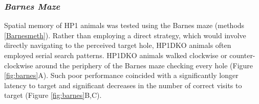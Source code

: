 \documentclass[onehalf,12pt]{beavtex}
\begin{document}
  \FloatBarrier
  
  \subsubsection*{\texorpdfstring{\emph{Barnes
  Maze}}{Barnes Maze}}\label{barnes-maze}
  
  Spatial memory of HP1 animals was tested using the Barnes maze (methods
  \ref{Barnesmeth}). Rather than employing a direct strategy, which would
  involve directly navigating to the perceived target hole, HP1DKO animals
  often employed serial search patterns. HP1DKO animals walked clockwise
  or counter-clockwise around the periphery of the Barnes maze checking
  every hole (Figure \ref{fig:barnes}A). Such poor performance coincided
  with a significantly longer latency to target and significant decreases
  in the number of correct visits to target (Figure \ref{fig:barnes}B,C).
  
\end{document}
